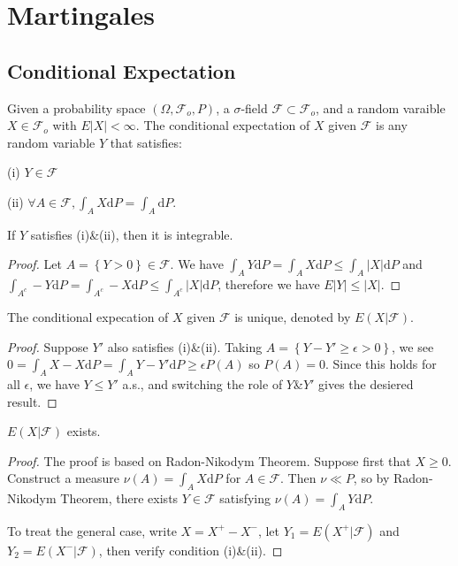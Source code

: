 
\chapter{Martingales}
\section{Conditional Expectation}
\begin{definition}
Given a probability space $(\Omega,\mathcal{F}_o,P)$, a $\sigma$-field $\mathcal{F}\subset\mathcal{F}_o$, and a random varaible $X\in\mathcal{F}_o$ with $E\left|X\right|<\infty$. The conditional expectation of $X$ given $\mathcal{F}$ is any random variable $Y$ that satisfies:\par
(i) $Y\in\mathcal{F}$\par
(ii) $\forall A\in\mathcal{F},\int_AX\mathrm{d}P=\int_A\mathrm{d}P$.
\end{definition}
\begin{lemma}
If $Y$ satisfies (i)\&(ii), then it is integrable.
\end{lemma}
\begin{proof}
Let $A=\left \{ Y>0 \right \} \in \mathcal{F}$. We have $\int_AY\mathrm{d}P=\int_AX\mathrm{d}P\le\int_A\left | X \right | \mathrm{d}P$ and $\int_{A^c}-Y\mathrm{d}P=\int_{A^c}-X\mathrm{d}P\le \int_{A^c}\left | X \right | \mathrm{d}P$, therefore we have $E\left |Y \right | \le\left | X \right | $.
\end{proof}
\begin{theorem}
The conditional expecation of $X$ given $\mathcal{F}$ is unique, denoted by $E(X|\mathcal{F})$.
\end{theorem}
\begin{proof}
Suppose $Y'$ also satisfies (i)\&(ii). Taking $A=\left \{ Y-Y'\ge\epsilon>0 \right \} $, we see $0=\int_AX-X\mathrm{d}P=\int_AY-Y'\mathrm{d}P\ge\epsilon P(A)$ so $P(A)=0$. Since this holds for all $\epsilon$, we have $Y\le Y'$ a.s., and switching the role of $Y$\&$Y'$ gives the desiered result.
\end{proof}
\begin{theorem}
$E(X|\mathcal{F})$ exists.
\end{theorem}
\begin{proof}
The proof is based on Radon-Nikodym Theorem. Suppose first that $X\ge 0$. Construct  a measure $\nu(A)=\int_AX\mathrm{d}P$ for $A\in\mathcal{F}$. Then $\nu\ll P$, so by Radon-Nikodym Theorem, there exists $Y\in\mathcal{F}$ satisfying $\nu(A)=\int_AY\mathrm{d}P$.\par
To treat the general case, write $X=X^+-X^-$, let $Y_1=E(X^+|\mathcal{F})$ and $Y_2=E(X^-|\mathcal{F})$, then verify condition (i)\&(ii).
\end{proof}
